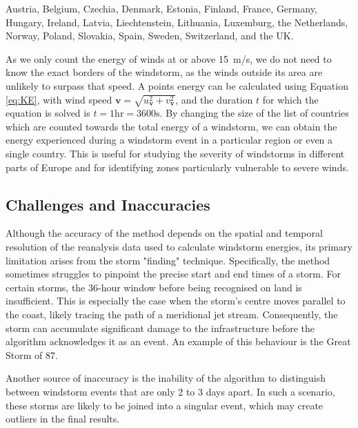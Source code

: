         Austria, Belgium, Czechia, Denmark, Estonia, Finland, France, Germany, Hungary, Ireland, Latvia, Liechtenstein, Lithuania, Luxemburg, the Netherlands, Norway, Poland, Slovakia, Spain, Sweden, Switzerland, and the UK.

        As we only count the energy of winds at or above 15~m/s, we do not need to know the exact borders of the windstorm, as the winds outside its area are unlikely to surpass that speed. A points energy can be calculated using Equation \ref{eq:KE}, with wind speed $\mathbf{v} = \sqrt{u^2_{\mathbf{v}} + v^2_{\mathbf{v}}}$, and the duration $t$ for which the equation is solved is $t = 1\text{hr}=3600\text{s}$. By changing the size of the list of countries which are counted towards the total energy of a windstorm, we can obtain the energy experienced during a windstorm event in a particular region or even a single country. This is useful for studying the severity of windstorms in different parts of Europe and for identifying zones particularly vulnerable to severe winds.
        
    \subsection{Challenges and Inaccuracies}

        Although the accuracy of the method depends on the spatial and temporal resolution of the reanalysis data used to calculate windstorm energies, its primary limitation arises from the storm "finding" technique. Specifically, the method sometimes struggles to pinpoint the precise start and end times of a storm. For certain storms, the 36-hour window before being recognised on land is insufficient. This is especially the case when the storm's centre moves parallel to the coast, likely tracing the path of a meridional jet stream. Consequently, the storm can accumulate significant damage to the infrastructure before the algorithm acknowledges it as an event. An example of this behaviour is the Great Storm of 87. 
        
        Another source of inaccuracy is the inability of the algorithm to distinguish between windstorm events that are only 2 to 3 days apart. In such a scenario, these storms are likely to be joined into a singular event, which may create outliers in the final results.